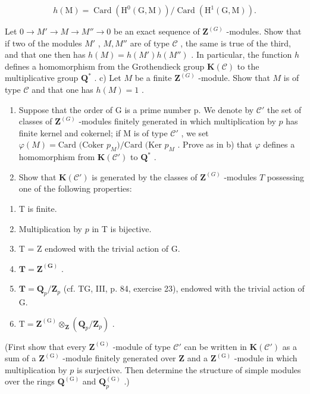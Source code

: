 \[
h (\mathrm{M}) = \operatorname{Card} \left(\mathrm{H} ^ {0} (\mathrm{G}, \mathrm{M})\right) / \operatorname{Card} \left(\mathrm{H} ^ {1} (\mathrm{G}, \mathrm{M})\right).
\]

Let \(0 \to M' \to M \to M'' \to 0\) be an exact sequence of \(\mathbf{Z}^{(G)}\) -modules. Show that if two of the modules \(M'\) , \(M, M''\) are of type \(\mathcal{C}\) , the same is true of the third, and that one then has \(h(M) = h(M') h(M'')\) . In particular, the function \(h\) defines a homomorphism from the Grothendieck group \(\mathbf{K}(\mathcal{C})\) to the multiplicative group \(\mathbf{Q}^*\) . c) Let \(M\) be a finite \(\mathbf{Z}^{(G)}\) -module. Show that \(M\) is of type \(\mathcal{C}\) and that one has \(h(M) = 1\) .

\begin{enumerate}
\def\labelenumi{\alph{enumi})}
\setcounter{enumi}{3}
\item
  Suppose that the order of G is a prime number p. We denote by \(\mathcal{C}'\) the set of classes of \(\mathbf{Z}^{(G)}\) -modules finitely generated in which multiplication by \(p\) has finite kernel and cokernel; if M is of type \(\mathcal{C}'\) , we set \(\varphi(M) = \text{Card (Coker } p_M)/\text{Card (Ker } p_M\) . Prove as in b) that \(\varphi\) defines a homomorphism from \(\mathbf{K}(\mathcal{C}')\) to \(\mathbf{Q}^*\) .
\item
  Show that \(\mathbf{K}(\mathcal{C}')\) is generated by the classes of \(\mathbf{Z}^{(G)}\) -modules \(T\) possessing one of the following properties:
\end{enumerate}

\begin{enumerate}
\def\labelenumi{(\roman{enumi})}
\item
  T is finite.
\item
  Multiplication by \(p\) in T is bijective.
\item
  T = Z endowed with the trivial action of G.
\item
  \(\mathbf{T} = \mathbf{Z}^{(\mathbf{G})}\) .
\item
  \(\mathbf{T} = \mathbf{Q}_p / \mathbf{Z}_p\) (cf. TG, III, p. 84, exercise 23), endowed with the trivial action of G.
\item
  \(\mathrm{T} = \mathbf{Z}^{(\mathrm{G})}\otimes_{\mathbf{Z}}(\mathbf{Q}_p / \mathbf{Z}_p)\) .
\end{enumerate}

(First show that every \(\mathbf{Z}^{(\mathrm{G})}\) -module of type \(\mathcal{C}'\) can be written in \(\mathbf{K}(\mathcal{C}')\) as a sum of a \(\mathbf{Z}^{(\mathrm{G})}\) -module finitely generated over \(\mathbf{Z}\) and a \(\mathbf{Z}^{(\mathrm{G})}\) -module in which multiplication by \(p\) is surjective. Then determine the structure of simple modules over the rings \(\mathbf{Q}^{(\mathrm{G})}\) and \(\mathbf{Q}_p^{(\mathrm{G})}\) .)

